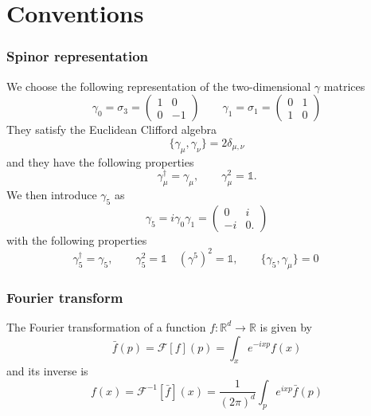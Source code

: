 
\chapter{Conventions} %
\label{chap:AppendixA} %
\subsection*{Spinor representation}
We choose the following representation of the two-dimensional $\gamma$ matrices
\begin{equation*}
        \gamma_0 = \sigma_3 = 
        \begin{pmatrix}
            1 & 0 \\
            0 & -1    
        \end{pmatrix}
        \qquad 
        \gamma_1 = \sigma_1 = 
        \begin{pmatrix}
            0 & 1 \\
            1 & 0    
        \end{pmatrix}
\end{equation*}
They satisfy the Euclidean Clifford algebra
\begin{equation*}
    \{\gamma_\mu, \gamma_\nu\} = 2\delta_{\mu, \nu}
\end{equation*}
and they have the following properties
\begin{equation*}
    \gamma_\mu^{\dagger}=\gamma_\mu, \quad  \quad \gamma_\mu^2=\mathbb{1}.
\end{equation*}
We then introduce $\gamma_5$ as
\begin{equation*}
    \gamma_5 = i \gamma_0 \gamma_1 =
    \begin{pmatrix}
        0 & i \\
        -i & 0. 
    \end{pmatrix}
\end{equation*}
with the following properties
\begin{equation*} 
    \gamma_5^{\dagger}=\gamma_5, \qquad \gamma_5^2=\mathbb{1} \quad
    (\gamma^5)^2 = \mathbb{1}, \qquad \{\gamma_5, \gamma_\mu\} = 0 \qquad 
\end{equation*}



\subsection*{Fourier transform}
The Fourier transformation of a function $f: \mathbb{R}^d \rightarrow \mathbb{R}$ is given by
$$
\bar{f}(p)=\mathcal{F}[f](p)=\int_x e^{-ixp} f(x)
$$
and its inverse is
$$
f(x)=\mathcal{F}^{-1}[\bar{f}](x)=\frac{1}{(2 \pi)^d} \int_p e^{ixp} \bar{f}(p)
$$
